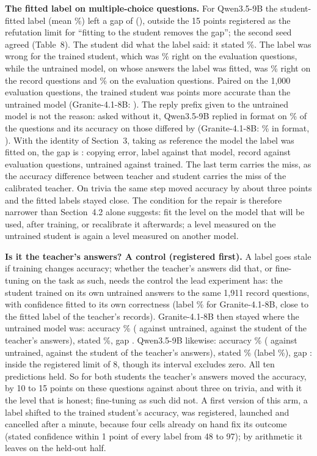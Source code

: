 \documentclass[10pt]{article}
\begin{document}
\textbf{The fitted label on multiple-choice questions.} For Qwen3.5-9B the student-fitted label (mean \mQScalLabel{}\%) left a gap of \mQScalGap{} (\mQScalGapCI{}), outside the 15 points registered as the refutation limit for ``fitting to the student removes the gap''; the second seed agreed (Table~8). The student did what the label said: it stated \mQScalConf{}\%. The label was wrong for the trained student, which was \mQScalAcc{}\% right on the evaluation questions, while the untrained model, on whose answers the label was fitted, was \mQBaseRecAcc{}\% right on the record questions and \mQBaseEvalAcc{}\% on the evaluation questions. Paired on the 1{,}000 evaluation questions, the trained student was \nQTrainDiff{} points more accurate than the untrained model (Granite-4.1-8B: \nGTrainDiff{}). The reply prefix given to the untrained model is not the reason: asked without it, Qwen3.5-9B replied in format on \nQNoPrefixFmt{}\% of the questions and its accuracy on those differed by \nQPrefixDiff{} (Granite-4.1-8B: \nGNoPrefixFmt{}\% in format, \nGPrefixDiff{}). With the identity of Section~3, taking as reference the model the label was fitted on, the gap is \nQDecomp{}: copying error, label against that model, record against evaluation questions, untrained against trained. The last term carries the miss, as the accuracy difference between teacher and student carries the miss of the calibrated teacher. On trivia the same step moved accuracy by about three points and the fitted labels stayed close. The condition for the repair is therefore narrower than Section~4.2 alone suggests: fit the level on the model that will be used, after training, or recalibrate it afterwards; a level measured on the untrained student is again a level measured on another model.

\textbf{Is it the teacher's answers? A control (registered first).} A label goes stale if training changes accuracy; whether the teacher's answers did that, or fine-tuning on the task as such, needs the control the lead experiment has: the student trained on its own untrained answers to the same 1{,}911 record questions, with confidence fitted to its own correctness (label \nGOwnLabel{}\% for Granite-4.1-8B, close to the fitted label of the teacher's records). Granite-4.1-8B then stayed where the untrained model was: accuracy \nGOwnAcc{}\% (\nGOwnVsBase{} against untrained, \nGOwnVsScal{} against the student of the teacher's answers), stated \nGOwnConf{}\%, gap \nGOwnGap{}. Qwen3.5-9B likewise: accuracy \nQOwnAcc{}\% (\nQOwnVsBase{} against untrained, \nQOwnVsScal{} against the student of the teacher's answers), stated \nQOwnConf{}\% (label \nQOwnLabel{}\%), gap \nQOwnGap{}: inside the registered limit of 8, though its interval excludes zero. All ten predictions held. So for both students the teacher's answers moved the accuracy, by 10 to 15 points on these questions against about three on trivia, and with it the level that is honest; fine-tuning as such did not. A first version of this arm, a label shifted to the trained student's accuracy, was registered, launched and cancelled after a minute, because four cells already on hand fix its outcome (stated confidence within 1 point of every label from 48 to 97); by arithmetic it leaves \nShiftForecast{} on the held-out half.
\end{document}

